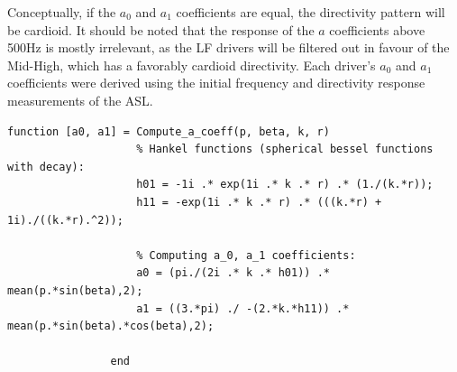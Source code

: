 \documentclass{report}
\begin{document}
            Conceptually, if the $a_0$ and $a_1$ coefficients are equal, the directivity pattern will be cardioid.
            It should be noted that the response of the $a$ coefficients above 500Hz is mostly irrelevant, as the LF drivers will be filtered out in favour of the Mid-High, which has a favorably cardioid directivity.
            Each driver's $a_0$ and $a_1$ coefficients were derived using the initial frequency and directivity response measurements of the ASL.
            \begin{lstlisting}[style=Matlab-editor, gobble=16]
                function [a0, a1] = Compute_a_coeff(p, beta, k, r)
                    % Hankel functions (spherical bessel functions with decay):
                    h01 = -1i .* exp(1i .* k .* r) .* (1./(k.*r));
                    h11 = -exp(1i .* k .* r) .* (((k.*r) + 1i)./((k.*r).^2));

                    % Computing a_0, a_1 coefficients:
                    a0 = (pi./(2i .* k .* h01)) .* mean(p.*sin(beta),2);
                    a1 = ((3.*pi) ./ -(2.*k.*h11)) .* mean(p.*sin(beta).*cos(beta),2);
                
                end
            \end{lstlisting}
\end{document}
